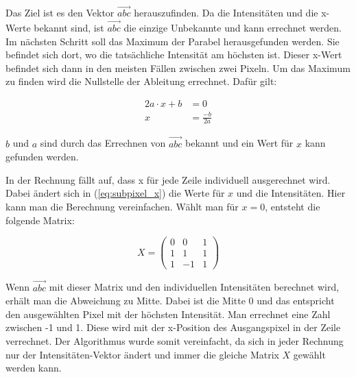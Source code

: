 	Das Ziel ist es den Vektor \( \vec{abc} \) herauszufinden. Da die Intensitäten und die x-Werte bekannt sind, ist \( \vec{abc} \) die einzige Unbekannte und kann errechnet werden. Im nächsten Schritt soll das Maximum der Parabel herausgefunden werden. Sie befindet sich dort, wo die tatsächliche Intensität am höchsten ist. Dieser x-Wert befindet sich dann in den meisten Fällen zwischen zwei Pixeln. Um das Maximum zu finden wird die Nullstelle der Ableitung errechnet. Dafür gilt:
	
	\begin{equation}
	\begin{aligned}
	2a \cdot x + b &= 0 \\
	x &= \frac{-b}{2a}
	\end{aligned}
	\end{equation}
	
	\( b \) und \( a \) sind durch das Errechnen von \( \vec{abc} \) bekannt und ein Wert für \( x \) kann gefunden werden.
	
	In der Rechnung fällt auf, dass x für jede Zeile individuell ausgerechnet wird. Dabei ändert sich in (\ref{eq:subpixel_x}) die Werte für \( x \) und die Intensitäten. Hier kann man die Berechnung vereinfachen. Wählt man für \( x = 0\), entsteht die folgende Matrix:
	
	\begin{equation}
	X = \begin{pmatrix}
	0 & 0 & 1 \\
	1 & 1 & 1 \\
	1 & -1 & 1
	\end{pmatrix}
	\end{equation}
	
	Wenn \( \vec{abc} \) mit dieser Matrix und den individuellen Intensitäten berechnet wird, erhält man die Abweichung zu Mitte. Dabei ist die Mitte 0 und das entspricht den ausgewählten Pixel mit der höchsten Intensität. Man errechnet eine Zahl zwischen -1 und 1. Diese wird mit der x-Position des Ausgangspixel in der Zeile verrechnet. Der Algorithmus wurde somit vereinfacht, da sich in jeder Rechnung nur der Intensitäten-Vektor ändert und immer die gleiche Matrix \( X \) gewählt werden kann.
	
